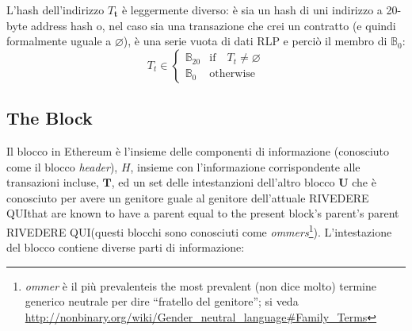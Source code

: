 \documentclass[9pt,oneside]{amsart}
\begin{document}
\begin{multicols}{2}
L'hash dell'indirizzo $T_\mathbf{t}$ è leggermente diverso: è sia un hash di uni indirizzo a 20-byte address hash o, nel caso sia una transazione che crei un contratto (e quindi formalmente uguale a $\varnothing$), è una serie vuota di dati RLP e perciò il membro di $\mathbb{B}_0$:
\begin{equation}
T_t \in \begin{cases} \mathbb{B}_{20} & \text{if} \quad T_t \neq \varnothing \\
\mathbb{B}_{0} & \text{otherwise}\end{cases}
\end{equation}

\subsection{The Block} \label{ch:block}

Il blocco in Ethereum è l'insieme delle componenti di informazione (conosciuto come il blocco \textit{header}), $H$, insieme con l'informazione corrispondente alle transazioni incluse, $\mathbf{T}$, ed un set delle intestanzioni dell'altro blocco $\mathbf{U}$ che è conosciuto per avere un genitore guale al genitore dell'attuale RIVEDERE QUIthat are known to have a parent equal to the present block's parent's parent RIVEDERE QUI(questi blocchi sono conosciuti come \textit{ommers}\footnote{\textit{ommer} è il più prevalenteis the most prevalent (non dice molto) termine generico neutrale per dire ``fratello del genitore''; si veda \url{http://nonbinary.org/wiki/Gender_neutral_language#Family_Terms}}). L'intestazione del blocco contiene diverse parti di informazione:



\end{multicols}
\end{document}
